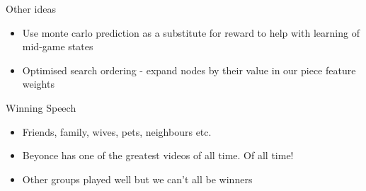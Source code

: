 \documentclass{beamer}
\begin{document}
\begin{frame}{Other ideas}
    \begin{itemize}
  \item
    Use monte carlo prediction as a substitute for reward to help with learning of mid-game states
  \item
    Optimised search ordering - expand nodes by their value in our piece feature weights
  \end{itemize}
\end{frame}

\begin{frame}{Winning Speech}
    \begin{itemize}
  \item
    Friends, family, wives, pets, neighbours etc.
  \item
   Beyonce has one of the greatest videos of all time. Of all time!
  \item
   Other groups played well but we can't all be winners
  \end{itemize}
\end{frame}
\end{document}
